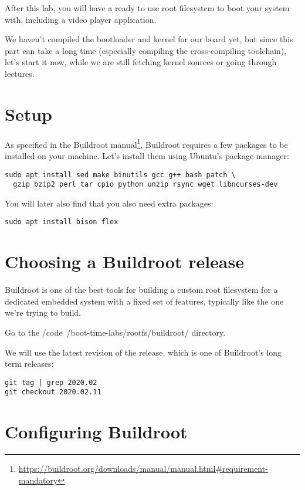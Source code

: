 
After this lab, you will have a ready to use root filesystem to boot
your system with, including a video player application.

We haven't compiled the bootloader and kernel for our board yet,
but since this part can take a long time (especially compiling the
cross-compiling toolchain), let's start it now, while we are still
fetching kernel sources or going through lectures.

\section{Setup}

As specified in the Buildroot
manual\footnote{\url{https://buildroot.org/downloads/manual/manual.html\#requirement-mandatory}},
Buildroot requires a few packages to be installed on your
machine. Let's install them using Ubuntu's package manager:

\begin{verbatim}
sudo apt install sed make binutils gcc g++ bash patch \
  gzip bzip2 perl tar cpio python unzip rsync wget libncurses-dev
\end{verbatim}

You will later also find that you also need extra packages:

\begin{verbatim}
sudo apt install bison flex
\end{verbatim}

\section{Choosing a Buildroot release}

Buildroot is one of the best tools for building a custom root filesystem
for a dedicated embedded system with a fixed set of features, typically
like the one we're trying to build.

Go to the /code{~/boot-time-labs/rootfs/buildroot/} directory.

We will use the latest revision of the  release, which is
one of Buildroot's long term releases:

\begin{verbatim}
git tag | grep 2020.02
git checkout 2020.02.11
\end{verbatim}

\section{Configuring Buildroot}

